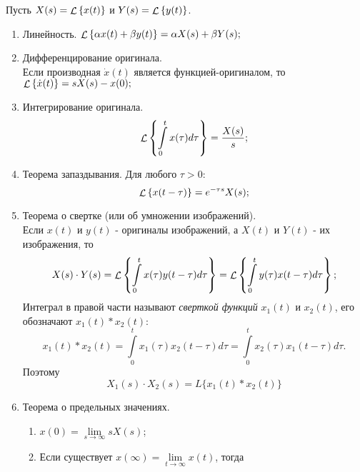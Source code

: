 \documentclass[../../TAU.tex]{subfiles}
\begin{document}
    Пусть 
    $X(s) = \mathop{\mathcal{L}}\nolimits\left\{x(t)\right\}$ и 
    $Y(s) = \mathop{\mathcal{L}}\nolimits\left\{y(t)\right\}$.
    \begin{enumerate}
        \item Линейность. $\mathop{\mathcal{L}}\nolimits\left\{\alpha x(t) + \beta y(t)\right\} = \alpha X(s) + \beta Y(s);$
        \item Дифференцирование оригинала. \\
            Если производная 
            $\dot x(t)$ 
            является функцией-оригиналом, то 
            $\mathop{\mathcal{L}}\nolimits\left\{\dot x(t)\right\} = sX(s) - x(0);$
        \item Интегрирование оригинала.
            \begin{equation}
                \mathop{\mathcal{L}}\nolimits\left\{\int\limits_0^tx(\tau)d\tau\right\} = \frac{X(s)}{s};
            \end{equation}
        \item Теорема запаздывания. Для любого $\tau>0$:
            \begin{equation}
                \mathop{\mathcal{L}}\nolimits\left\{x(t-\tau)\right\} = e^{-\tau s}X(s);
            \end{equation}
        \item  Теорема о свертке (или об умножении изображений).\\
            Если $x(t)$ и $y(t)$ - оригиналы изображений, а $X(t)$ и $Y(t)$ - их изображения, то
            \begin{equation}
                X(s)\cdot Y(s) = \mathop{\mathcal{L}}\nolimits\left\{\int\limits_0^tx(\tau)y(t-\tau)d\tau\right\} = \mathop{\mathcal{L}}\nolimits\left\{\int\limits_0^ty(\tau)x(t-\tau)d\tau\right\};
            \end{equation}
            Интеграл в правой части называют {\it сверткой функций} $x_1(t)$ и $x_2(t)$, его обозначают $x_1(t) * x_2(t)$:
            \begin{equation}
                x_1(t)*x_2(t) = \int\limits_0^t x_1(\tau) x_2(t-\tau) d{\tau} = \int\limits_0^t x_2(\tau) x_1(t-\tau)d\tau.
            \end{equation}
            Поэтому 
            \begin{equation}
                X_1(s) \cdot X_2(s) = L\{x_1(t) * x_2(t)\}
            \end{equation}
        \item Теорема о предельных значениях.
            \begin{enumerate}[label*={\arabic*}]
                \item 
                    $x(0) = \lim\limits_{s\rightarrow\infty}sX(s)$;
                \item Если существует 
                    $x(\infty) = \lim\limits_{t\rightarrow\infty} x(t)$, тогда 

\end{enumerate}
\end{enumerate}
\end{document}
